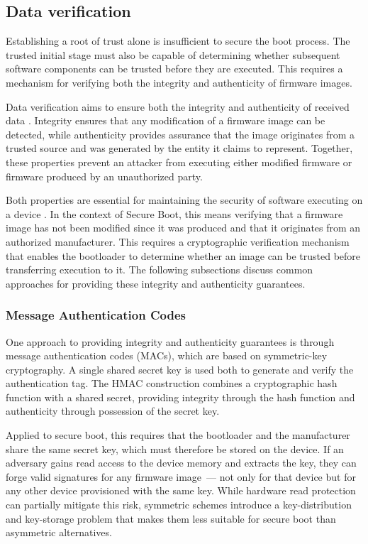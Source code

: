 \subsection{Data verification}
\label{subsection:bg-secureboot-verification}

Establishing a root of trust alone is insufficient to secure the boot process. The trusted initial stage must also be capable of determining whether subsequent software components can be trusted before they are executed. This requires a mechanism for verifying both the integrity and authenticity of firmware images.

Data verification aims to ensure both the integrity and authenticity of received data \cite{digital_signature_standard, ccsds_crypto_algorithms}. Integrity ensures that any modification of a firmware image can be detected, while authenticity provides assurance that the image originates from a trusted source and was generated by the entity it claims to represent. Together, these properties prevent an attacker from executing either modified firmware or firmware produced by an unauthorized party.

Both properties are essential for maintaining the security of software executing on a device \cite{NIST-sp-800-193}. In the context of Secure Boot, this means verifying that a firmware image has not been modified since it was produced and that it originates from an authorized manufacturer. This requires a cryptographic verification mechanism that enables the bootloader to determine whether an image can be trusted before transferring execution to it. The following subsections discuss common approaches for providing these integrity and authenticity guarantees.

\subsubsection{Message Authentication Codes}
\label{subsubsection:bg-secureboot-verification-mac}

One approach to providing integrity and authenticity guarantees is through message authentication codes (MACs), which are based on symmetric-key cryptography. A single shared secret key is used both to generate and verify the authentication tag. The HMAC construction \cite{nist_hmac} combines a cryptographic hash function with a shared secret, providing integrity through the hash function and authenticity through possession of the secret key.

Applied to secure boot, this requires that the bootloader and the manufacturer share the same secret key, which must therefore be stored on the device. If an adversary gains read access to the device memory and extracts the key, they can forge valid signatures for any firmware image~--- not only for that device but for any other device provisioned with the same key. While hardware read protection can partially mitigate this risk, symmetric schemes introduce a key-distribution and key-storage problem that makes them less suitable for secure boot than asymmetric alternatives.

